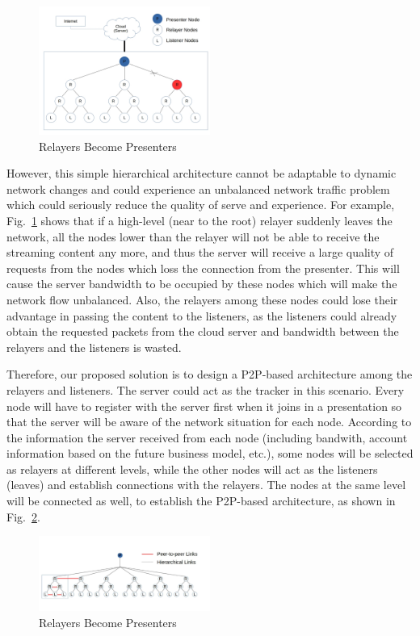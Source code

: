 \begin{figure}[h!]  
  \centering
      \includegraphics[width=0.5\textwidth]{figures/model2_test2.jpg}
  \caption{Relayers Become Presenters}
  \label{fig:mod2}
\end{figure}

However, this simple hierarchical architecture cannot be adaptable to 
dynamic network changes and could experience an unbalanced network 
traffic problem which could seriously reduce the quality of serve and 
experience. For example, Fig.~\ref{fig:mod2} shows that if a 
high-level (near to the root) relayer suddenly leaves the network, all the 
nodes lower than the relayer will not be able to receive the streaming content 
any more, and thus the server will receive a large quality of requests from the 
nodes which loss the connection from the presenter. This will cause the server 
bandwidth to be occupied by these nodes which will make the network flow 
unbalanced. Also, the relayers among these nodes could lose their advantage in 
passing the content to the listeners, as the listeners could already obtain the 
requested packets from the cloud server and bandwidth between the relayers 
and the listeners is wasted. 

Therefore, our proposed solution is to design a P2P-based 
architecture among the relayers 
and listeners. The server could act as the tracker in this scenario. Every node 
will have to register with the server first when it joins in a presentation so 
that the server will be aware of the network situation for each node. According 
to the information the server received from each node (including bandwith, 
account information based on the future business model, etc.), some nodes will 
be selected as relayers at different levels, while the other nodes will act as 
the listeners (leaves) and establish connections with the relayers. The nodes 
at the same level will be connected as well, to establish the P2P-based 
architecture, as shown in Fig.~\ref{fig:mod3}.


\begin{figure}[h!]  
  \centering
      \includegraphics[width=0.5\textwidth]{figures/model3_test2.jpg}
  \caption{Relayers Become Presenters}
  \label{fig:mod3}
\end{figure}


